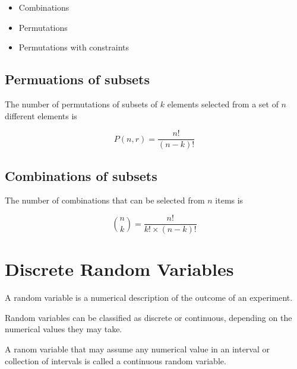 \documentclass[12pt]{article}
\begin{document}
\begin{itemize}
\item Combinations
\item Permutations
\item Permutations with constraints
\end{itemize}



\subsection{Permuations of subsets}

The number of permutations of subsets of $k$ elements selected from a set of $n$ different elements is

\[P(n,r) = \frac{n!}{(n-k)!}  \]


\subsection{Combinations of subsets}

The number of combinations that can be selected from $n$ items is

\[ {n \choose k} = \frac{n!}{k! \times (n-k)!}  \]
\newpage
\section{Discrete Random Variables}

A random variable is a numerical description of the outcome of an experiment.

Random variables can be classified as discrete or continuous, depending on the numerical values they may take.

A ranom variable that may assume any numerical value in an interval or collection of intervals is called a continuous random variable.
\end{document}
